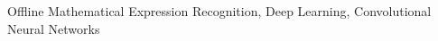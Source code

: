 \documentclass[conference]{IEEEtran}
\begin{document}
\begin{IEEEkeywords}
Offline Mathematical Expression Recognition, Deep Learning, Convolutional Neural Networks 
\end{IEEEkeywords}
























\end{document}
